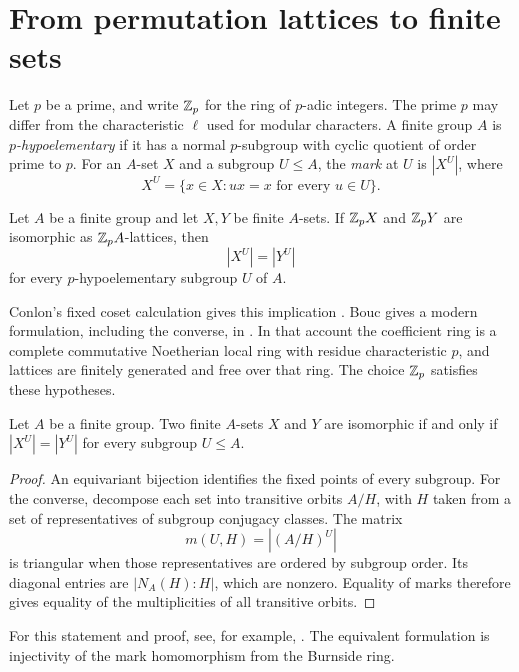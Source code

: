 \section{From permutation lattices to finite sets}

Let $p$ be a prime, and write $\mathbb Z_p$ for the ring of $p$-adic
integers. The prime $p$ may differ from the characteristic $\ell$
used for modular characters. A finite group $A$ is
\emph{$p$-hypoelementary} if it has a normal $p$-subgroup with cyclic
quotient of order prime to $p$.
For an $A$-set $X$ and a subgroup $U\leq A$, the \emph{mark} at $U$
is $|X^U|$, where
\[
 X^U=\{x\in X:ux=x\text{ for every }u\in U\}.
\]

\begin{theorem}[Conlon]
Let $A$ be a finite group and let $X,Y$ be finite $A$-sets.
If $\mathbb Z_p X$ and $\mathbb Z_p Y$ are isomorphic as $\mathbb Z_p A$-lattices, then
\[
 |X^U|=|Y^U|
\]
for every $p$-hypoelementary subgroup $U$ of $A$.
\end{theorem}

Conlon's fixed coset calculation gives this implication
\cite[Section~4, especially (4.7)]{Conlon1968}.
Bouc gives a modern formulation, including the converse, in
\cite[Theorem~3.5.5]{Bouc2000}.
In that account the coefficient ring is a complete commutative
Noetherian local ring with residue characteristic $p$, and lattices
are finitely generated and free over that ring. The choice $\mathbb Z_p$
satisfies these hypotheses.

\begin{theorem}
Let $A$ be a finite group. Two finite $A$-sets $X$ and $Y$ are
isomorphic if and only if $|X^U|=|Y^U|$ for every subgroup $U\leq A$.
\end{theorem}
\begin{proof}
An equivariant bijection identifies the fixed points of every subgroup.
For the converse, decompose each set into transitive orbits $A/H$,
with $H$ taken from a set of representatives of subgroup conjugacy
classes. The matrix
\[
 m(U,H)=|(A/H)^U|
\]
is triangular when those representatives are ordered by subgroup
order. Its diagonal entries are $|N_A(H):H|$, which are nonzero.
Equality of marks therefore gives equality of the multiplicities of
all transitive orbits.
\end{proof}
For this statement and proof, see, for example,
\cite[Theorem~2.3.2]{Bouc2000}.
The equivalent formulation is injectivity of the mark homomorphism
from the Burnside ring.

